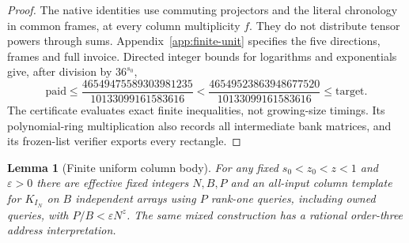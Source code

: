 \documentclass[11pt]{article}
\newtheorem{lemma}[theorem]{Lemma}
\begin{document}
\begin{proof}
The native identities use commuting projectors and the literal chronology
in common frames, at every column multiplicity $f$. They do not distribute
tensor powers through sums. Appendix~\ref{app:finite-unit} specifies the
five directions, frames and full invoice. Directed integer bounds for logarithms and exponentials
give, after division by $36^{s_0}$,
\[\text{paid}\le\frac{46549475589303981235}{10133099161583616}
 <\frac{46549523863948677520}{10133099161583616}\le\text{target}.
\]
The certificate evaluates exact finite inequalities, not growing-size
timings. Its polynomial-ring multiplication also records all intermediate
bank matrices, and its frozen-list verifier exports every rectangle.
\end{proof}

\begin{lemma}[Finite uniform column body]\label{lem:body}
For any fixed $s_0<z_0<z<1$ and $\varepsilon>0$ there are effective fixed integers $N,B,P$
and an all-input column template for $K_{I_N}$ on $B$ independent arrays
using $P$ rank-one queries, including owned queries, with $P/B<\varepsilon N^z$.
The same mixed construction has a rational order-three address
interpretation.
\end{lemma}
\end{document}
